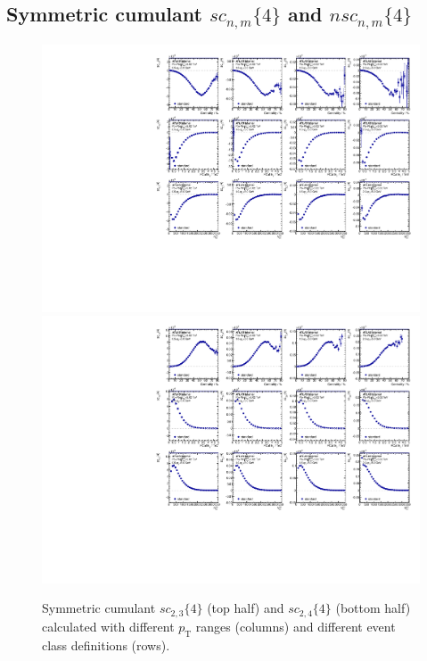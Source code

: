 \subsection{Symmetric cumulant $sc_{n,m}\{4\}$ and $nsc_{n,m}\{4\}$}
\begin{figure}[H]
\centering
\includegraphics[width=.95\linewidth]{figs/sec_result/forQM/phy_sc_Har2.pdf}
\includegraphics[width=.95\linewidth]{figs/sec_result/forQM/phy_sc_Har3.pdf}
\caption{Symmetric cumulant $sc_{2,3}\{4\}$ (top half) and $sc_{2,4}\{4\}$ (bottom half) calculated with different $p_\text{T}$ ranges (columns) and different event class definitions (rows).}
\label{fig:result_phy_sc_Har23}
\end{figure}
